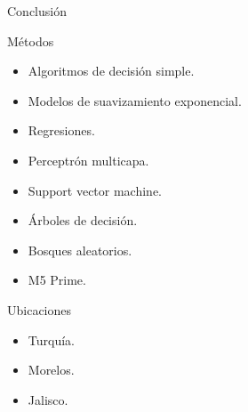 \documentclass[aspectratio=169]{beamer}
\begin{document}
\begin{frame}{Conclusión}
    \vspace{-1cm}\begin{minipage}{0.7\textwidth}
        \begin{block}{Métodos}
            \begin{itemize}
                \item Algoritmos de decisión simple.
                \item Modelos de suavizamiento exponencial.
                \item Regresiones.
                \item Perceptrón multicapa.
                \item Support vector machine.
                \item Árboles de decisión.
                \item Bosques aleatorios.
                \item M5 Prime.
            \end{itemize}
        \end{block}
    \end{minipage}%
    \begin{minipage}{0.3\textwidth}
        \pause\begin{block}{Ubicaciones}
            \begin{itemize}
                \item Turquía.
                \item Morelos.
                \item Jalisco.
            \end{itemize}
        \end{block}
    \end{minipage}
\end{frame}
\end{document}
